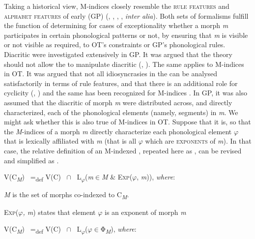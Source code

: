 \documentclass[output=paper,
modfonts
]{LSP/langsci}
\begin{document}
Taking a historical view, M-indices closely resemble the \textsc{rule features} and \textsc{alphabet features} of early  (GP) (\citealt{chomskyhalle1968}, \citealt{lakoff1970}, \citealt{coats1970}, \citealt{zonneveld1978}, \textit{inter alia}). Both sets of formalisms fulfill the function of determining for cases of exceptionality whether a morph \textit{m} participates in certain phonological patterns or not, by ensuring that \textit{m} is visible or not visible as required, to OT's constraints or GP's phonological rules. Diacritic  were investigated extensively in GP. It was argued that the theory should not allow the  to manipulate diacritic  (\citealt{kiparsky1973r}, \citealt{zonneveld1978}). The same applies to M-indices in OT. It was argued that not all idiosyncrasies in the  can be analysed satisfactorily in terms of rule  features, and that there is an additional role for cyclicity (\citealt{chomskyhalle1968}, \citealt{kiparsky1982r}) and the same has been recognized for M-indices \citep{pater2009r}. In GP, it was also assumed that the diacritic  of morph \textit{m} were distributed across, and directly characterized, each of the phonological elements (namely, segments) in \textit{m}. We might ask whether this is also true of M-indices in OT. Suppose that it is, so that the \textit{M}{}-indices of a morph \textit{m} directly characterize each phonological element $\varphi $ that is lexically affiliated with \textit{m} (that is all $\varphi $ which are \textsc{exponents} of \textit{m}). In that case, the relative definition of an M-indexed  , repeated here as , can be revised and simplified as . 

\ea \label{ex:round:45}
V(\textsc{C}\textsubscript{\textit{M}}) \ =\textsubscript{def} V(\textsc{C}) \ ${\cap}$ \ L\textsubscript{$\varphi $}(\textit{m}${\in}$\textit{M} \& \textsc{Exp}($\varphi $, \textit{m})), \textit{where}:

\textit{M} is the set of morphs co-indexed to C\textit{\textsubscript{M}}.

\textsc{Exp}($\varphi $\textit{, m}) states that element $\varphi $\textit{} is an exponent of morph \textit{m}
\z

\ea \label{ex:round:46}
V(\textsc{C}\textsubscript{\textit{M}}) \ =\textsubscript{def} V(\textsc{C)} \ ${\cap}$ \ L\textsubscript{$\varphi $}($\varphi $${\in}$Φ\textit{\textsubscript{M}}), \textit{where}:
\end{document}
